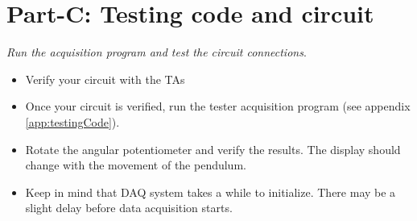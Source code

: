 \documentclass{article} %
\begin{document}
\newpage
\section{Part-C: Testing code and circuit}
\emph{Run the acquisition program and test the circuit connections}.
\begin{itemize}
\item Verify your circuit with the TAs
\item Once your circuit is verified, run the tester acquisition program (see appendix \ref{app:testingCode}).
\item Rotate the angular potentiometer and verify the results. The display should change with the movement of the pendulum.
\item Keep in mind that DAQ system takes a while to initialize. There may be a slight delay before data acquisition starts.
\end{itemize}
\end{document}
